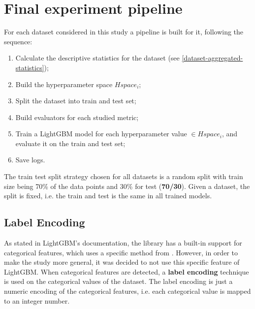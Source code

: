 \section{Final experiment pipeline}

For each dataset considered in this study a pipeline is built for it, following the sequence:

\begin{enumerate}
    \item Calculate the descriptive statistics for the dataset (see \ref{dataset-aggregated-statistics});
    \item Build the hyperparameter space $Hspace_i$;
    \item Split the dataset into train and test set;
    \item Build evaluators for each studied metric;
    \item Train a LightGBM model for each hyperparameter value $\in Hspace_i$, and evaluate it on the train and test set;
    \item Save logs.
\end{enumerate}

The train test split strategy chosen for all datasets is a random split with train size being 70\% of the data points and 30\% for test (\textbf{70/30}). Given a dataset, the split is fixed, i.e. the train and test is the same in all trained models.

\subsection{Label Encoding}

As stated in LightGBM's documentation, the library has a built-in support for categorical features, which uses a specific method from \cite{fisher1958grouping}. However, in order to make the study more general, it was decided to not use this specific feature of LightGBM. When categorical features are detected, a \textbf{label encoding} technique is used on the categorical values of the dataset. The label encoding is just a numeric encoding of the categorical features, i.e. each categorical value is mapped to an integer number. 

